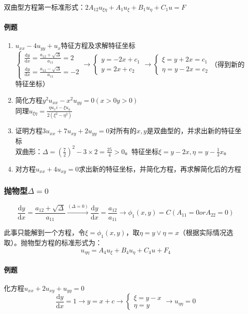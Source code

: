 双曲型方程第一标准形式：\(2A_{12}u_{\xi\eta}+A_1u_\xi+B_1u_\eta+C_1u=F\)

\paragraph{例题}
\begin{enumerate}
	\item \(u_{xx}-4u_{yy}+u_x\)特征方程及求解特征坐标\\
	\(\begin{cases}\frac{\mathrm{d}y}{\mathrm{d}x}=\frac{a_{12}+\sqrt\Delta}{a_{11}}=2\\\frac{\mathrm{d}y}{\mathrm{d}x}=\frac{a_{12}-\sqrt\Delta}{a_{11}}=-2\end{cases}\rightarrow\begin{cases}y=-2x+c_1\\y=2x+c_2\end{cases}\rightarrow\begin{cases}\xi=y+2x=c_1\\\eta=y-2x=c_2\end{cases}\)（得到新的特征坐标）
	\item 简化方程\(y^2u_{xx}-x^2u_{yy}=0(x>0y>0)\)\\
	同理\(u_{\xi\eta}=\frac{\eta u_xi-\xi u_\eta}{2(\xi^2-\eta^2)}\)
	\item 证明方程\(3u_{xx}+7u_{xy}+2u_{yy}=0\)对所有的\(x,y\)是双曲型的，并求出新的特征坐标\\
	双曲形：\(\Delta=\left(\frac{7}{2}\right)^2-3\times 2=\frac{25}{4}>0\)。特征坐标\(\xi=y-2x,\eta=y-\frac{1}{3}x\)。
	\item 对方程\(u_{xx}+4u_{xy}=0\)求出新的特征坐标，并简化方程，再求解简化后的方程
\end{enumerate}

\subsubsection{抛物型\(\Delta=0\)}
\[
\frac{\mathrm{d}y}{\mathrm{d}x}=\frac{a_{12}+\sqrt\Delta}{a_{11}}\xrightarrow{\left(\Delta=0\right)}\frac{\mathrm{d}y}{\mathrm{d}x}=\frac{a_{12}}{a_{11}}\rightarrow\phi_1(x,y)=C\left(A_{11}=0orA_{22}=0\right) 
\]

此事只能解到一个方程，令\(\xi=\phi_1(x,y)\)，取\(\eta=y \vee \eta=x\)（根据实际情况选取）。抛物型方程的标准形式为：
\[
u_{\eta\eta}=A_4u_\xi+B_4u_\eta+C_4u+F_4
\]

\paragraph{例题}化方程\(u_{xx}+2u_{xy}+u_{yy}=0\)
\[
\frac{\mathrm{d}y}{\mathrm{d}x}=1\rightarrow y=x+c\rightarrow\begin{cases}\xi=y-x\\\eta=y\end{cases}\rightarrow u_{\eta\eta}=0
\]

